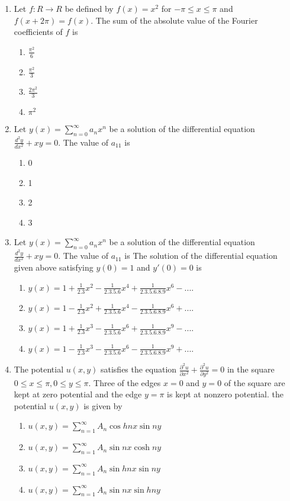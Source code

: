 \documentclass[journal,12pt,onecolumn]{IEEEtran}
\theoremstyle{remark}
\begin{document}
\begin{enumerate}
\item Let $f:R\rightarrow R$ be defined by $f(x)=x^2$ for $-\pi \leq x \leq \pi$ and $f(x+2\pi)=f(x).$  
The sum of the absolute value of the Fourier coefficients of $f$ is
\begin{enumerate}
    \item $\frac{\pi^2}{6}$
    \item $\frac{\pi^2}{3}$
    \item $\frac{2\pi^2}{3}$
    \item $\pi^2$ \\
\end{enumerate}

\item Let $y(x)=\sum_{n=0}^\infty a_n x^n$ be a solution of the differential equation $\frac{d^2 y}{dx^2}+xy=0.$
The value of $a_{11}$ is 
\begin{enumerate}
    \item 0
    \item 1
    \item 2 
    \item 3 \\
\end{enumerate}

\item Let $y(x)=\sum_{n=0}^\infty a_n x^n$ be a solution of the differential equation $\frac{d^2 y}{dx^2}+xy=0.$
The value of $a_11$ is The solution of the differential equation given above satisfying $y(0)=1$ and $y'(0)=0$ is 
\begin{enumerate}
    \item $y(x)=1+\frac{1}{2.3}x^2-\frac{1}{2.3.5.6}x^4+\frac{1}{2.3.5.6.8.9}x^6-....$
    \item $y(x)=1-\frac{1}{2.3}x^2+\frac{1}{2.3.5.6}x^4-\frac{1}{2.3.5.6.8.9}x^6+....$
    \item $y(x)=1+\frac{1}{2.3}x^3-\frac{1}{2.3.5.6}x^6+\frac{1}{2.3.5.6.8.9}x^9-....$
    \item $y(x)=1-\frac{1}{2.3}x^3-\frac{1}{2.3.5.6}x^6-\frac{1}{2.3.5.6.8.9}x^9+....$ \\
\end{enumerate}

\item The potential $u(x,y)$ satisfies the equation $\frac{\partial^2 u}{\partial x^2}+\frac{\partial^2 u}{\partial y^2}=0$ in the square $0 \leq x \leq \pi, 0\leq y \leq \pi.$ Three of the edges $x=0$ and $y=0$ of the square are kept at zero potential and the edge $y=\pi$ is kept at nonzero potential. the potential $u(x,y)$ is given by 
\begin{enumerate}
 \item $u(x,y)=\sum_{n=1}^\infty A_n \cos h nx \sin ny$
 \item $u(x,y)=\sum_{n=1}^\infty A_n \sin nx \cosh ny$
 \item $u(x,y)=\sum_{n=1}^\infty A_n \sin h nx \sin ny$
 \item $u(x,y)=\sum_{n=1}^\infty A_n \sin nx \sin h ny$ \\
\end{enumerate}


\end{enumerate}
\end{document}
